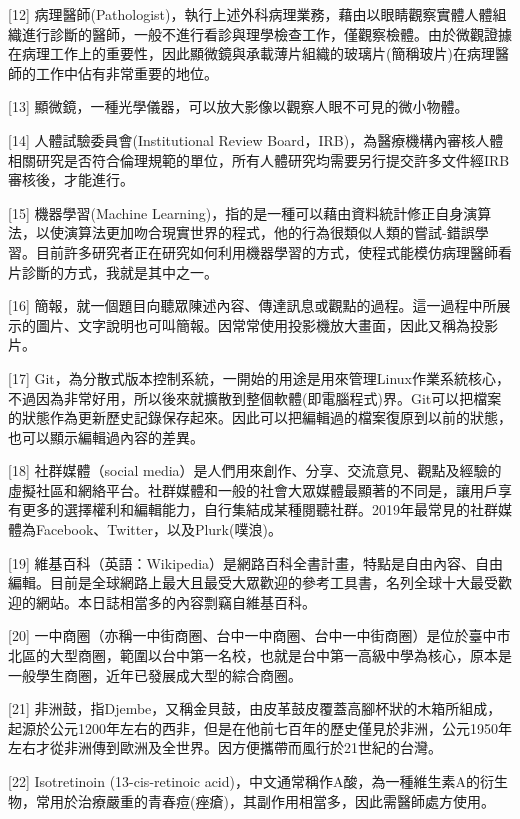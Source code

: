 \documentclass[a5paper, 11pt
]{book}
\begin{document}
{[}12{]}
病理醫師(Pathologist)，執行上述外科病理業務，藉由以眼睛觀察實體人體組織進行診斷的醫師，一般不進行看診與理學檢查工作，僅觀察檢體。由於微觀證據在病理工作上的重要性，因此顯微鏡與承載薄片組織的玻璃片(簡稱玻片)在病理醫師的工作中佔有非常重要的地位。

{[}13{]} 顯微鏡，一種光學儀器，可以放大影像以觀察人眼不可見的微小物體。

{[}14{]} 人體試驗委員會(Institutional Review
Board，IRB)，為醫療機構內審核人體相關研究是否符合倫理規範的單位，所有人體研究均需要另行提交許多文件經IRB審核後，才能進行。

{[}15{]} 機器學習(Machine
Learning)，指的是一種可以藉由資料統計修正自身演算法，以使演算法更加吻合現實世界的程式，他的行為很類似人類的嘗試-錯誤學習。目前許多研究者正在研究如何利用機器學習的方式，使程式能模仿病理醫師看片診斷的方式，我就是其中之一。

{[}16{]}
簡報，就一個題目向聽眾陳述內容、傳達訊息或觀點的過程。這一過程中所展示的圖片、文字說明也可叫簡報。因常常使用投影機放大畫面，因此又稱為投影片。

{[}17{]}
Git，為分散式版本控制系統，一開始的用途是用來管理Linux作業系統核心，不過因為非常好用，所以後來就擴散到整個軟體(即電腦程式)界。Git可以把檔案的狀態作為更新歷史記錄保存起來。因此可以把編輯過的檔案復原到以前的狀態，也可以顯示編輯過內容的差異。

{[}18{]} 社群媒體（social
media）是人們用來創作、分享、交流意見、觀點及經驗的虛擬社區和網絡平台。社群媒體和一般的社會大眾媒體最顯著的不同是，讓用戶享有更多的選擇權利和編輯能力，自行集結成某種閱聽社群。2019年最常見的社群媒體為Facebook、Twitter，以及Plurk(噗浪)。

{[}19{]}
維基百科（英語：Wikipedia）是網路百科全書計畫，特點是自由內容、自由編輯。目前是全球網路上最大且最受大眾歡迎的參考工具書，名列全球十大最受歡迎的網站。本日誌相當多的內容剽竊自維基百科。

{[}20{]}
一中商圈（亦稱一中街商圈、台中一中商圈、台中一中街商圈）是位於臺中市北區的大型商圈，範圍以台中第一名校，也就是台中第一高級中學為核心，原本是一般學生商圈，近年已發展成大型的綜合商圈。

{[}21{]}
非洲鼓，指Djembe，又稱金貝鼓，由皮革鼓皮覆蓋高腳杯狀的木箱所組成，起源於公元1200年左右的西非，但是在他前七百年的歷史僅見於非洲，公元1950年左右才從非洲傳到歐洲及全世界。因方便攜帶而風行於21世紀的台灣。

{[}22{]} Isotretinoin (13-cis-retinoic
acid)，中文通常稱作A酸，為一種維生素A的衍生物，常用於治療嚴重的青春痘(痤瘡)，其副作用相當多，因此需醫師處方使用。
\end{document}
